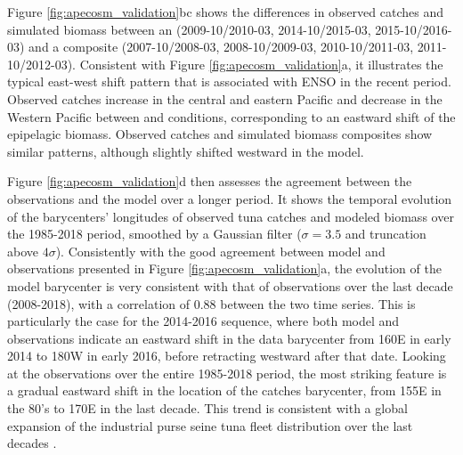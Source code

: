 Figure \ref{fig:apecosm_validation}bc shows the differences in observed catches and simulated biomass between an \nino{} (2009-10/2010-03, 2014-10/2015-03, 2015-10/2016-03) and a \nina{} composite (2007-10/2008-03, 2008-10/2009-03, 2010-10/2011-03, 2011-10/2012-03). Consistent with Figure \ref{fig:apecosm_validation}a, it illustrates the typical east-west shift pattern that is associated with ENSO in the recent period. Observed catches increase in the central and eastern Pacific and decrease in the Western Pacific between \nina{} and \nino{} conditions, corresponding to an eastward shift of the epipelagic biomass. Observed catches and simulated biomass composites show similar patterns, although slightly shifted westward in the model.

Figure \ref{fig:apecosm_validation}d then assesses the agreement between the observations and the model over a longer period. It shows the temporal evolution of the barycenters' longitudes of observed tuna catches and modeled biomass over the 1985-2018 period, smoothed by a Gaussian filter ($\sigma=3.5$ and truncation above $4\sigma$). Consistently with the good agreement between model and observations presented in Figure \ref{fig:apecosm_validation}a, the evolution of the model barycenter  is very consistent with that of observations over the last decade (2008-2018), with a correlation of 0.88 between the two time series. This is particularly the case for the 2014-2016 \nino{} sequence, where both model and observations indicate an eastward shift in the data barycenter from 160\degree{}E in early 2014 to 180\degree{}W in early 2016, before retracting westward after that date. Looking at the observations over the entire 1985-2018 period, the most striking feature is a gradual eastward shift in the location of the catches barycenter, from 155\degree{}E in the 80's to 170\degree{}E in the last decade. This trend is consistent with a global expansion of the industrial purse seine tuna fleet distribution over the last decades \citep{coulterUsingHarmonizedHistorical2020}. 

